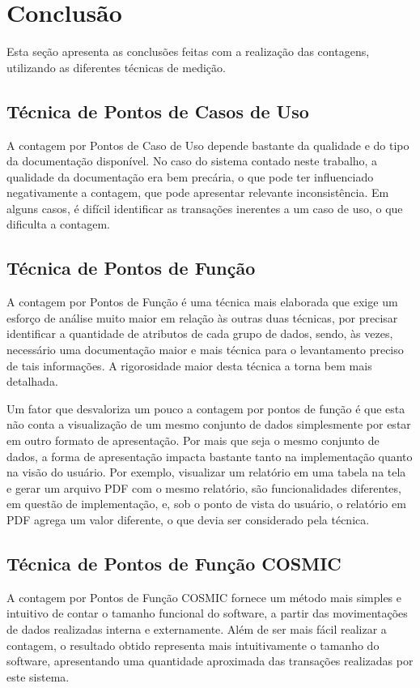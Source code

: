 \chapter{Conclusão}

  Esta seção apresenta as conclusões feitas com a realização das contagens, utilizando as diferentes técnicas de medição.

  \section{Técnica de Pontos de Casos de Uso}
      
    A contagem por Pontos de Caso de Uso depende bastante da qualidade e do tipo da documentação disponível.
    No caso do sistema contado neste trabalho, a qualidade da documentação era bem precária, o que pode 
    ter influenciado negativamente a contagem, que pode apresentar relevante inconsistência. Em alguns casos, é difícil 
    identificar as transações inerentes a um caso de uso, o que dificulta a contagem.
	
  \section{Técnica de Pontos de Função}
    
    A contagem por Pontos de Função é uma técnica mais elaborada que exige um esforço de análise muito maior em relação às outras duas 
    técnicas, por precisar identificar a quantidade de atributos de cada grupo de dados, sendo, às vezes, necessário uma documentação maior e mais técnica
    para o levantamento preciso de tais informações. A rigorosidade maior desta técnica a torna bem mais detalhada.
    
    Um fator que desvaloriza um pouco a contagem por pontos de função é que esta não conta a visualização de um mesmo 
    conjunto de dados simplesmente por estar em outro formato de apresentação. Por mais que seja o mesmo conjunto de dados, 
    a forma de apresentação impacta bastante tanto na implementação quanto na visão do usuário. Por exemplo, visualizar um relatório 
    em uma tabela na tela e gerar um arquivo PDF com o mesmo relatório, são funcionalidades diferentes, em questão de implementação, 
    e, sob o ponto de vista do usuário, o relatório em PDF agrega um valor diferente, o que devia ser considerado pela técnica.
	
  \section{Técnica de Pontos de Função COSMIC}
  
    A contagem por Pontos de Função COSMIC fornece um método mais simples e intuitivo de contar o tamanho funcional do software, 
    a partir das movimentações de dados realizadas interna e externamente. Além de ser mais fácil realizar a contagem, o resultado obtido 
    representa mais intuitivamente o tamanho do software, apresentando uma quantidade aproximada das transações realizadas por este sistema.
	